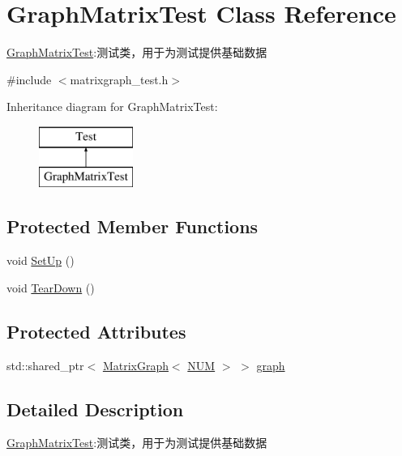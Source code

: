 \hypertarget{class_graph_matrix_test}{}\section{Graph\+Matrix\+Test Class Reference}
\label{class_graph_matrix_test}


\hyperlink{class_graph_matrix_test}{Graph\+Matrix\+Test}\+:测试类，用于为测试提供基础数据  




{\ttfamily \#include $<$matrixgraph\+\_\+test.\+h$>$}

Inheritance diagram for Graph\+Matrix\+Test\+:\begin{figure}[H]
\begin{center}
\leavevmode
\includegraphics[height=2.000000cm]{class_graph_matrix_test}
\end{center}
\end{figure}
\subsection*{Protected Member Functions}
\begin{DoxyCompactItemize}
\item 
void \hyperlink{class_graph_matrix_test_a0bf059febd79340f3fd0a07998b86084}{Set\+Up} ()
\item 
void \hyperlink{class_graph_matrix_test_a6ecc6a16df121b02fd29a278f38083c9}{Tear\+Down} ()
\end{DoxyCompactItemize}
\subsection*{Protected Attributes}
\begin{DoxyCompactItemize}
\item 
std\+::shared\+\_\+ptr$<$ \hyperlink{struct_introdunction_to_algorithm_1_1_graph_algorithm_1_1_matrix_graph}{Matrix\+Graph}$<$ \hyperlink{matrixgraph__test_8h_aaf0952059602752258dccaa015d7b54a}{N\+U\+M} $>$ $>$ \hyperlink{class_graph_matrix_test_ad384a40b300fe51ecc31c15f197f1723}{graph}
\end{DoxyCompactItemize}


\subsection{Detailed Description}
\hyperlink{class_graph_matrix_test}{Graph\+Matrix\+Test}\+:测试类，用于为测试提供基础数据 

